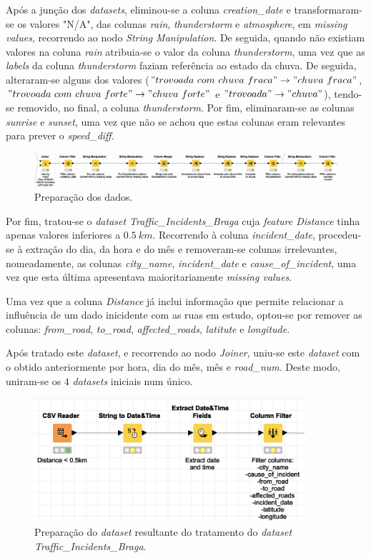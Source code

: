 \documentclass[a4paper, 12pt]{article}
\begin{document}
Após a junção dos \textit{datasets}, eliminou-se a coluna \textit{creation\_date} e transformaram-se os valores "N/A", das colunas \textit{rain}, \textit{thunderstorm} e \textit{atmosphere}, em \textit{missing values}, recorrendo ao nodo \textit{String Manipulation}. De seguida, quando não existiam valores na coluna \textit{rain} atribuia-se o valor da coluna \textit{thunderstorm}, uma vez que as \textit{labels} da coluna \textit{thunderstorm} faziam referência ao estado da chuva. De seguida, alteraram-se alguns dos valores ($"trovoada \ com \ chuva \ fraca" \rightarrow "chuva \ fraca"$, $"trovoada \ com \ chuva \ forte" \rightarrow "chuva \ forte"$ e $"trovoada" \rightarrow "chuva"$), tendo-se removido, no final, a coluna \textit{thunderstorm}. Por fim, eliminaram-se as colunas \textit{sunrise} e \textit{sunset}, uma vez que não se achou que estas colunas eram relevantes para prever o \textit{speed\_diff}.

\begin{figure}[H]
	\centering
	\includegraphics[width=15cm]{prep}
	\caption{Preparação dos dados.}
\end{figure}

Por fim, tratou-se o \textit{dataset Traffic\_Incidents\_Braga} cuja \textit{feature Distance} tinha apenas valores inferiores a $0.5 \ km$. Recorrendo à coluna \textit{incident\_date}, procedeu-se à extração do dia, da hora e do mês e removeram-se colunas irrelevantes, nomeadamente, as colunas \textit{city\_name}, \textit{incident\_date} e \textit{cause\_of\_incident}, uma vez que esta última apresentava maioritariamente \textit{missing values}.

Uma vez que a coluna \textit{Distance} já inclui informação que permite relacionar a influência de um dado inicidente com as ruas em estudo, optou-se por remover as colunas: \textit{from\_road}, \textit{to\_road}, \textit{affected\_roads}, \textit{latitute} e \textit{longitude}.

Após tratado este \textit{dataset}, e recorrendo ao nodo \textit{Joiner}, uniu-se este \textit{dataset} com o obtido anteriormente por hora, dia do mês, mês e \textit{road\_num}. Deste modo, uniram-se os $4$ \textit{datasets} iniciais num único.

\begin{figure}[H]
	\centering
	\includegraphics[width=10cm]{Incident}
	\caption{Preparação do \textit{dataset} resultante do tratamento do \textit{dataset Traffic\_Incidents\_Braga}.}
\end{figure}
\end{document}
